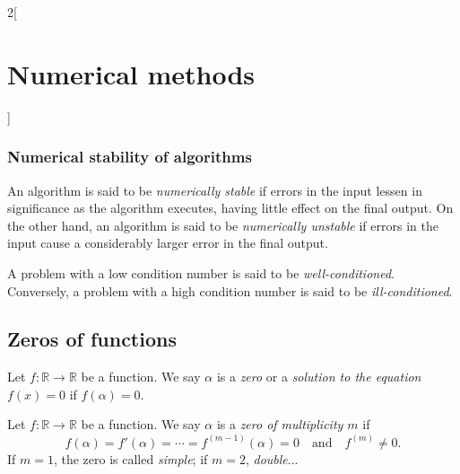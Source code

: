 \documentclass[class=article,10pt,crop=false]{standalone}
\begin{document}
\begin{multicols}{2}[\section{Numerical methods}]
\subsubsection*{Numerical stability of algorithms}
\begin{definition}
An algorithm is said to be \textit{numerically stable} if  errors in the input lessen in significance as the algorithm executes, having little effect on the final output. On the other hand, an algorithm is said to be \textit{numerically unstable} if errors in the input cause a considerably larger error in the final output.
\end{definition}
\begin{definition}
A problem with a low condition number is said to be \textit{well-conditioned}. Conversely, a problem with a high condition number is said to be \textit{ill-conditioned}.
\end{definition}
\subsection{Zeros of functions}
\begin{definition}
Let $f:\mathbb{R}\rightarrow\mathbb{R}$ be a function. We say $\alpha$ is a \textit{zero} or a \textit{solution to the equation $f(x)=0$} if $f(\alpha)=0$.
\end{definition}
\begin{definition}
Let $f:\mathbb{R}\rightarrow\mathbb{R}$ be a function. We say $\alpha$ is a \textit{zero of multiplicity $m$} if $$f(\alpha)=f'(\alpha)=\cdots=f^{(m-1)}(\alpha)=0\quad\text{and}\quad f^{(m)}\ne0.$$ If $m=1$, the zero is called \textit{simple}; if $m=2$, \textit{double}...
\end{definition}

\end{multicols}
\end{document}
